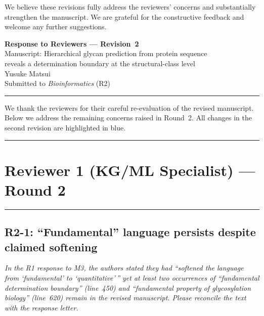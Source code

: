 \documentclass[11pt,a4paper]{article}
\newcommand{\reviewercomment}[1]{\textit{\color{black!70}#1}}
\begin{document}
\vspace{1em}

We believe these revisions fully address the reviewers' concerns and
substantially strengthen the manuscript. We are grateful for the constructive
feedback and welcome any further suggestions.

\newpage
\begin{center}
{\LARGE\bfseries Response to Reviewers --- Revision~2}\\[0.8em]
{\large Manuscript: Hierarchical glycan prediction from protein sequence\\
reveals a determination boundary at the structural-class level}\\[0.5em]
{\normalsize Yusuke Matsui}\\[0.3em]
{\normalsize Submitted to \textit{Bioinformatics} (R2)}
\end{center}

\noindent\rule{\linewidth}{0.4pt}
\vspace{0.5em}

We thank the reviewers for their careful re-evaluation of the revised
manuscript. Below we address the remaining concerns raised in Round~2. All
changes in the second revision are highlighted in blue.

\vspace{1em}
\noindent\rule{\linewidth}{0.8pt}

\section*{Reviewer 1 (KG/ML Specialist) --- Round 2}
\noindent\rule{\linewidth}{0.4pt}

\subsection*{R2-1: ``Fundamental'' language persists despite claimed softening}

\reviewercomment{In the R1 response to M3, the authors stated they had
``softened the language from `fundamental' to `quantitative'\,'' yet at least
two occurrences of ``fundamental determination boundary'' (line~450) and
``fundamental property of glycosylation biology'' (line~620) remain in the
revised manuscript. Please reconcile the text with the response letter.}
\end{document}
